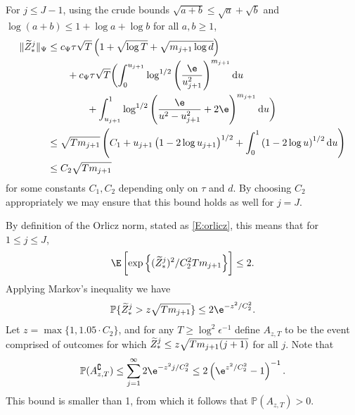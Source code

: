 \documentclass[11pt]{amsart}
\renewcommand{\P}{\mathbb{P}}
\begin{document}
For $j\le J-1$, using the crude bounds $\sqrt{a+b}\le \sqrt{a}+\sqrt{b}$ and $\log(a+b)\le 1+ \log a + \log b$ for all $a,b\ge 1$,
\begin{align*}
\|\tZ_{*}^{j}\|_{\Psi}&\le c_\Psi \tau \sqrt{T} \left( 1 + \sqrt{\log T} + \sqrt{m_{j+1} \log d} \right) \\
&\qquad + 	c_\Psi \tau \sqrt{T} \biggl( \int_{0}^{u_{j+1}} \log^{1/2}\left( \frac{\e}{u_{j+1}^2} \right)^{m_{j+1}}  \dif u\\
&\qquad\qquad  +  \int_{u_{j+1}}^1 \log^{1/2}   \left(\frac{\e }{u^2 - u_{j+1}^2} +2\e \right)^{m_{j+1}} \dif u \biggr)\\
  &\le \sqrt{T m_{j+1}} \left( C_1 + u_{j+1}  \left( 1-  2\log u_{j+1} \right)^{1/2} + \int_0^1 \left( 1- 2\log u \right)^{1/2} \dif u \right)\\
&\le C_{2}\sqrt{Tm_{j+1}}
\end{align*}
for some constants $C_{1},C_{2}$ depending only on $\tau$ and $d$.
By choosing $C_{2}$ appropriately we may ensure that this bound holds as well for $j=J$.

By definition of the Orlicz norm, stated as \eqref{E:orlicz}, this means that for $1\le j\le J$,
$$
\E\left[\exp\left\{(\tZ_{*}^{j})^{2}/C_{2}^{2}Tm_{j+1}\right\}\right] \le 2.
$$
Applying Markov's inequality we have
$$
\P\{ \tZ_{*}^{j} > z\sqrt{Tm_{j+1}}\}\le 2\e^{-z^{2}/C_{2}^{2}}.
$$
Let $z=\max\{1,1.05\cdot C_{2}\}$, and for any $T\ge \log^{2}\epsilon^{-1}$ define $A_{z,T}$ to be the event comprised of
outcomes for which ${\widetilde{Z}_{*}^{j}\le z\sqrt{Tm_{j+1}(j+1)}}$ for all $j$. Note that
\begin{equation} \label{E:Azprob}
\P(A_{z,T}^{\complement})\le \sum_{j=1}^{\infty} 2\e^{-z^{2}j/C_{2}^{2}}\le 2\left(\e^{z^{2}/C_{2}^{2}}-1\right)^{-1}.
\end{equation}
This bound is smaller than 1, from which it follows that $\P(A_{z,T})>0$.
\end{document}
